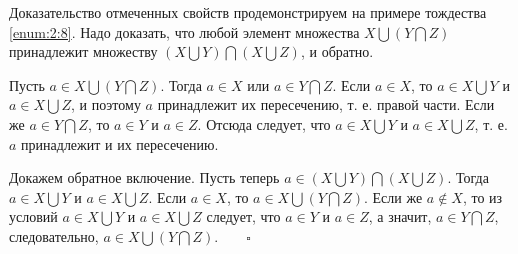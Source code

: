 \documentclass[a4paper,14pt]{article}
\begin{document}
\par Доказательство отмеченных свойств продемонстрируем на примере тождества \ref{enum:2:8}. Надо доказать, что любой элемент множества $X \bigcup (Y \bigcap Z)$ принадлежит множеству $(X \bigcup Y) \bigcap (X \bigcup Z)$, и обратно.
\par Пусть $a \in X \bigcup (Y \bigcap Z)$. Тогда $a \in X$ или $a \in Y \bigcap Z$. Если $a \in X$, то $a \in X \bigcup Y$ и $a \in X \bigcup Z$, и поэтому $a$ принадлежит их пересечению, т. е. правой части. Если же $a \in Y \bigcap Z$, то $a \in Y$ и $a \in Z$. Отсюда следует, что $a \in X \bigcup Y$ и $a \in X \bigcup Z$, т. е. $a$ принадлежит и их пересечению.
\par Докажем обратное включение. Пусть теперь $a \in (X \bigcup Y) \bigcap (X \bigcup Z)$. Тогда $a \in X \bigcup Y$ и $a \in X \bigcup Z$. Если $a \in X$, то $a \in X \bigcup (Y \bigcap Z)$. Если же $a \notin X$, то из условий $a \in X \bigcup Y$ и $a \in X \bigcup Z$ следует, что $a \in Y$ и $a \in Z$, а значит, $a \in Y \bigcap Z$, следовательно, $a \in X \bigcup (Y \bigcap Z)$.~~~~$\square$
\end{document}
